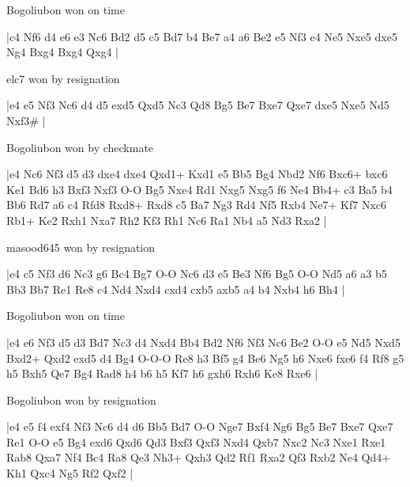 \showboard

Bogoliubon won on time

\makegametitle
|c4 Nf6 d4 e6 e3 Nc6 Bd2 d5 c5 Bd7 b4 Be7 a4 a6 Be2 e5 Nf3 e4 Ne5 Nxe5 dxe5 Ng4 Bxg4 Bxg4 Qxg4  |

\showboard

elc7 won by resignation

\makegametitle
|e4 e5 Nf3 Nc6 d4 d5 exd5 Qxd5 Nc3 Qd8 Bg5 Be7 Bxe7 Qxe7 dxe5 Nxe5 Nd5 Nxf3\#  |

\showboard

Bogoliubon won by checkmate

\makegametitle
|e4 Nc6 Nf3 d5 d3 dxe4 dxe4 Qxd1+ Kxd1 e5 Bb5 Bg4 Nbd2 Nf6 Bxc6+ bxc6 Ke1 Bd6 h3 Bxf3 Nxf3 O-O Bg5 Nxe4 Rd1 Nxg5 Nxg5 f6 Ne4 Bb4+ c3 Ba5 b4 Bb6 Rd7 a6 c4 Rfd8 Rxd8+ Rxd8 c5 Ba7 Ng3 Rd4 Nf5 Rxb4 Ne7+ Kf7 Nxc6 Rb1+ Ke2 Rxh1 Nxa7 Rh2 Kf3 Rh1 Nc6 Ra1 Nb4 a5 Nd3 Rxa2  |

\showboard

masood645 won by resignation

\makegametitle
|e4 c5 Nf3 d6 Nc3 g6 Bc4 Bg7 O-O Nc6 d3 e5 Be3 Nf6 Bg5 O-O Nd5 a6 a3 b5 Bb3 Bb7 Re1 Re8 c4 Nd4 Nxd4 cxd4 cxb5 axb5 a4 b4 Nxb4 h6 Bh4  |

\showboard

Bogoliubon won on time

\makegametitle
|e4 e6 Nf3 d5 d3 Bd7 Nc3 d4 Nxd4 Bb4 Bd2 Nf6 Nf3 Nc6 Be2 O-O e5 Nd5 Nxd5 Bxd2+ Qxd2 exd5 d4 Bg4 O-O-O Re8 h3 Bf5 g4 Be6 Ng5 h6 Nxe6 fxe6 f4 Rf8 g5 h5 Bxh5 Qe7 Bg4 Rad8 h4 b6 h5 Kf7 h6 gxh6 Rxh6 Ke8 Rxe6  |

\showboard

Bogoliubon won by resignation

\makegametitle
|e4 e5 f4 exf4 Nf3 Nc6 d4 d6 Bb5 Bd7 O-O Nge7 Bxf4 Ng6 Bg5 Be7 Bxe7 Qxe7 Re1 O-O e5 Bg4 exd6 Qxd6 Qd3 Bxf3 Qxf3 Nxd4 Qxb7 Nxc2 Nc3 Nxe1 Rxe1 Rab8 Qxa7 Nf4 Bc4 Ra8 Qe3 Nh3+ Qxh3 Qd2 Rf1 Rxa2 Qf3 Rxb2 Ne4 Qd4+ Kh1 Qxc4 Ng5 Rf2 Qxf2  |

\showboard

